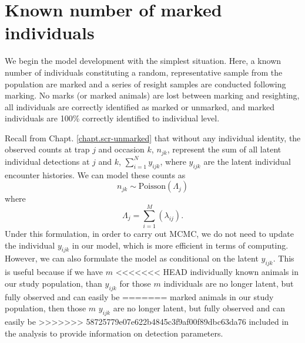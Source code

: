 \section{Known number of marked individuals}

We begin the model development with the simplest situation. Here, a known number of
individuals constituting a random, representative sample from the
population are marked and a series of resight samples are conducted
following marking. No marks (or marked animals) are lost between
marking and resighting, all individuals are correctly identified as
marked or unmarked, and marked individuals are 100\% correctly
identified to individual level.

Recall from Chapt. \ref{chapt.scr-unmarked} that without any individual identity, the observed counts at trap
$j$ and occasion $k$, $n_{jk}$, represent the sum of all latent
individual detections at $j$ and $k$,
$\displaystyle\sum\limits_{i=1}^{N} y_{ijk}$, where $y_{ijk}$ are the
latent individual encounter histories.
We can model these counts as
\[
n_{jk} \sim \mbox{Poisson}( \Lambda_{j} )
\]
where
\[
\Lambda_{j} = \sum_{i=1}^{M}( \lambda_{ij} ).
\]
Under this formulation, in order to carry out MCMC,
 we do not need to update the individual
$y_{ijk}$ in our model, which  is more efficient in terms of
computing. However, we can also formulate the model as conditional on
the latent $y_{ijk}$. This is useful because if we have $m$
<<<<<<< HEAD
individually known animals in our study population, than $y_{ijk}$ for
those $m$ individuals are no longer latent, but fully observed and can easily be
=======
marked
animals in our study population, then those $m$
$y_{ijk}$ are no longer latent, but fully observed and can easily be
>>>>>>> 58725779e07e622b4845c3f9af00f89dbc63da76
included in the analysis to provide information on detection parameters.

